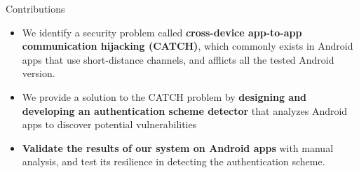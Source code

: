 \documentclass[10pt]{beamer}
\begin{document}
\begin{frame}[fragile]{Contributions}


 \begin{itemize}
  

 \item We identify a security problem called {\bf cross-device
     app-to-app communication hijacking (CATCH)}, which commonly
   exists in Android apps that use short-distance channels, and
   afflicts all the tested Android version.

 \item We provide a solution to the CATCH problem by {\bf designing
     and developing an authentication scheme detector} that analyzes
   Android apps to discover potential vulnerabilities

 \item {\bf Validate the results of our system on Android apps} with
   manual analysis, and test its resilience in detecting the
   authentication scheme.

\end{itemize}
  
\end{frame}
\end{document}
